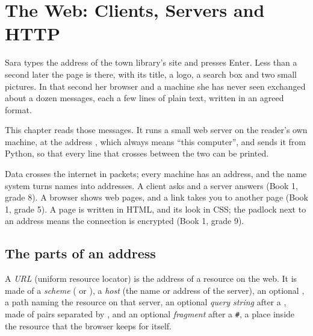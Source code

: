 \chapter{The Web: Clients, Servers and HTTP}\label{ch:g10:http-clients-servers}

Sara types the address of the town library's site and presses Enter. Less than a second later the page is there,
with its title, a logo, a search box and two small pictures. In that second her browser and a machine she has never
seen exchanged about a dozen messages, each a few lines of plain text, written in an agreed format.

This chapter reads those messages. It runs a small web server on the reader's own machine, at the address
, which always means ``this computer'', and sends it  from Python, so that every line
that crosses between the two can be printed.

\begin{recall}
Data crosses the internet in packets; every machine has an address, and the name system turns names into addresses.
A client asks and a server answers (Book 1, grade 8). A browser shows web pages, and a link takes you to another
page (Book 1, grade 5). A page is written in HTML, and its look in CSS; the padlock next to an address means the
connection is encrypted (Book 1, grade 9).
\end{recall}

\section{The parts of an address}\label{sec:g10:http-clients-servers:url}

\begin{definition}[URL]\label{def:g10:http-clients-servers:url}
A \emph{URL} (uniform resource locator) is the address of a resource on the web. It is made of a
\emph{scheme} ( or ), a \emph{host} (the name or address of the
server), an optional , a path naming the resource on that server, an optional \emph{query
string} after a , made of  pairs separated by \code{&}, and an optional
\emph{fragment} after a \texttt{\#}, a place inside the resource that the browser keeps for itself.
\end{definition}

